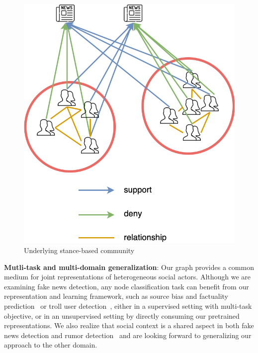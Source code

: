 \documentclass[fyp]{socreport}
\theoremstyle{definition}
\theoremstyle{hypothesis}
\begin{document}
\begin{figure}[t]
\centering
\includegraphics[scale=0.3]{cluster.png}
\caption{Underlying stance-based community}
\label{fig:cluster}
\end{figure}

\textbf{Mutli-task and multi-domain generalization}: Our graph provides a common medium for joint representations of heterogeneous social actors. Although we are examining fake news detection, any node classification task can benefit from our representation and learning framework, such as source bias and factuality prediction~\cite{baly2018predicting} or troll user detection~\cite{atanasov2019predicting}, either in a supervised setting with multi-task objective, or in an unsupervised setting by directly consuming our pretrained representations. We also realize that social context is a shared aspect in both fake news detection and rumor detection~\cite{zubiaga2018detection} and are looking forward to generalizing our approach to the other domain.



\end{document}
